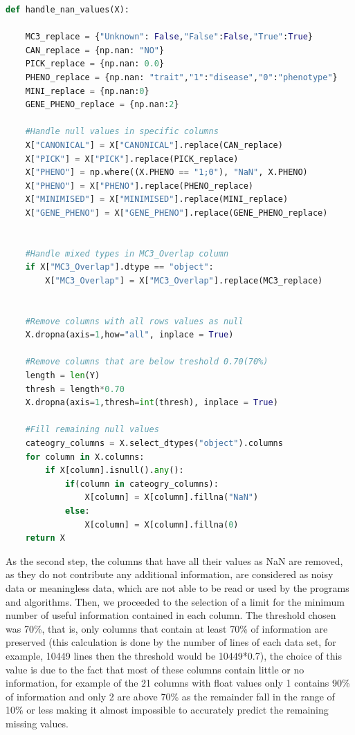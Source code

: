 \begin{lstlisting}[language=Python]
def handle_nan_values(X):
    
    MC3_replace = {"Unknown": False,"False":False,"True":True}
    CAN_replace = {np.nan: "NO"}
    PICK_replace = {np.nan: 0.0}
    PHENO_replace = {np.nan: "trait","1":"disease","0":"phenotype"}
    MINI_replace = {np.nan:0}
    GENE_PHENO_replace = {np.nan:2}
    
    #Handle null values in specific columns
    X["CANONICAL"] = X["CANONICAL"].replace(CAN_replace)
    X["PICK"] = X["PICK"].replace(PICK_replace)
    X["PHENO"] = np.where((X.PHENO == "1;0"), "NaN", X.PHENO)
    X["PHENO"] = X["PHENO"].replace(PHENO_replace)
    X["MINIMISED"] = X["MINIMISED"].replace(MINI_replace)
    X["GENE_PHENO"] = X["GENE_PHENO"].replace(GENE_PHENO_replace)
    
    
    #Handle mixed types in MC3_Overlap column
    if X["MC3_Overlap"].dtype == "object":
        X["MC3_Overlap"] = X["MC3_Overlap"].replace(MC3_replace)
    
    
    #Remove columns with all rows values as null
    X.dropna(axis=1,how="all", inplace = True)
    
    #Remove columns that are below treshold 0.70(70%)
    length = len(Y)
    thresh = length*0.70
    X.dropna(axis=1,thresh=int(thresh), inplace = True)
         
    #Fill remaining null values
    cateogry_columns = X.select_dtypes("object").columns
    for column in X.columns:
        if X[column].isnull().any():
            if(column in cateogry_columns):
                X[column] = X[column].fillna("NaN")
            else:
                X[column] = X[column].fillna(0)
    return X
\end{lstlisting}
\hspace{10px} As the second step, the columns that have all their values as NaN are removed, as they do not contribute any additional information, are considered as noisy data or meaningless data, which are not able to be read or used by the programs and algorithms. Then, we proceeded to the selection of a limit for the minimum number of useful information contained in each column. The threshold chosen was 70\%, that is, only columns that contain at least 70\% of information are preserved (this calculation is done by the number of lines of each data set, for example, 10449 lines then the threshold would be 10449*0.7), the choice of this value is due to the fact that most of these columns contain little or no information, for example of the 21 columns with float values only 1 contains 90\% of information and only 2 are above 70\% as the remainder fall in the range of 10\% or less making it almost impossible to accurately predict the remaining missing values. 



